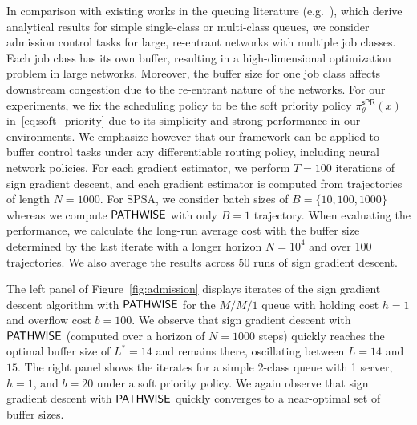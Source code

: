 In comparison with existing works in the queuing literature (e.g.~\cite{naor1969regulation, ccil2009effects, ghosh2007optimal}), which derive analytical results for simple single-class or multi-class queues, we consider admission control tasks for large, re-entrant networks with multiple job classes. Each job class has its own buffer, resulting in a high-dimensional optimization problem in large networks. Moreover, the buffer size for one job class affects downstream congestion due to the re-entrant nature of the networks. For our experiments, we fix the scheduling policy to be the soft priority policy $\pi^{\mathsf{sPR}}_{\theta}(x)$ in~\eqref{eq:soft_priority} due to its simplicity and strong performance in our environments. We emphasize however that our framework can be applied to buffer control tasks under any differentiable routing policy, including neural network policies. For each gradient estimator, we perform $T=100$ iterations of sign gradient descent, and each gradient estimator is computed from trajectories of length $N = 1000$. For SPSA, we consider batch sizes of $B = \{10 , 100, 1000\}$ whereas we compute $\mathsf{PATHWISE}$ with only $B=1$ trajectory. When evaluating the performance, we calculate the long-run average cost with the buffer size determined by the last iterate with a longer horizon $N = 10^4$ and over 100 trajectories. We also average the results across $50$ runs of sign gradient descent.



The left panel of Figure~\ref{fig:admission} displays iterates of the sign gradient descent algorithm with  $\mathsf{PATHWISE}$ for the $M/M/1$ queue with holding cost $h = 1$ and overflow cost $b = 100$. We observe that sign gradient descent with $\mathsf{PATHWISE}$ (computed over a horizon of $N=1000$ steps) quickly reaches the optimal buffer size of $L^{*} = 14$ and remains there, oscillating between $L = 14$ and $15$. The right panel shows the iterates for a simple 2-class queue with 1 server, $h = 1$, and $b = 20$ under a soft priority policy. We again observe that sign gradient descent with $\mathsf{PATHWISE}$  quickly converges to a near-optimal set of buffer sizes.

